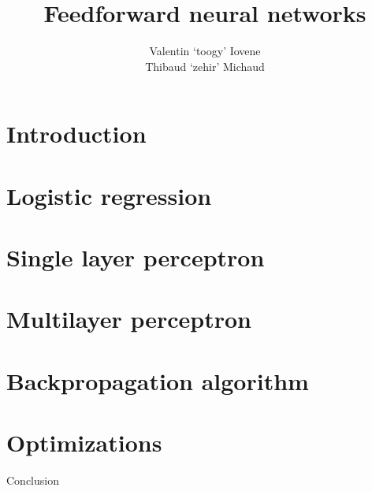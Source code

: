 \documentclass{beamer}
\title{Feedforward neural networks}
\author{Valentin `toogy' Iovene\\
Thibaud `zehir' Michaud}
\begin{document}
\maketitle

\begin{frame}
  \tableofcontents
\end{frame}

\section{Introduction}


\section{Logistic regression}


\section{Single layer perceptron}


\section{Multilayer perceptron}


\section{Backpropagation algorithm}


\section{Optimizations}


\begin{frame}
  \begin{center}
    \Large{Conclusion}
  \end{center}
\end{frame}
\end{document}

